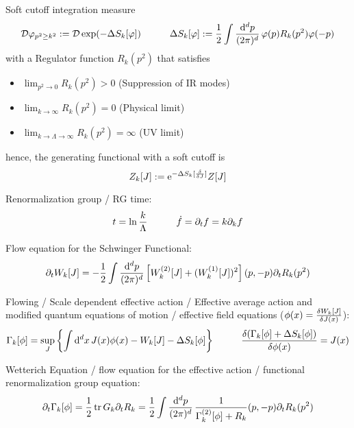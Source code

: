 		\noindent
		Soft cutoff integration measure
		\begin{equation}
			\mathcal{D}\varphi_{p^2 \ge k^2} := \mathcal{D} \exp(-\Delta S_k[\varphi])
			\hspace{30pt} \Delta S_k[\varphi] := \frac{1}{2} \int \frac{\dd^d p}{(2\pi)^d}\, \varphi(p)R_k(p^2) \varphi(-p)
		\end{equation}
		with a Regulator function $R_k(p^2)$ that satisfies
		\begin{itemize}\itemsep -0pt
			\item $\displaystyle\lim_{p^2 \rightarrow 0} R_k(p^2) > 0$ \hfill{(Suppression of IR modes)}
			\item $\displaystyle\lim_{k \rightarrow \infty} R_k(p^2) = 0$ \hfill{(Physical limit)}
			\item $\displaystyle\lim_{k \rightarrow \Lambda \rightarrow \infty} R_k(p^2) = \infty$ \hfill{(UV limit)}
		\end{itemize}
		hence, the generating functional with a soft cutoff is
		\begin{equation}
			Z_k[J] := \ex^{-\Delta S_k [\fdv{J}]}Z[J]
		\end{equation}

		\noindent
		Renormalization group / RG time:
		\begin{equation}
			t = \ln \frac{k}{\Lambda}
			\hspace{30pt} \dot{f} = \partial_t f = k \partial_k f
		\end{equation}

		\noindent
		Flow equation for the Schwinger Functional:
		\begin{equation}
			\partial_t W_k[J] = -\frac{1}{2}\int \frac{\dd^d p}{(2\pi)^d} \, \qty[W^{(2)}_k[J]+(W_k^{(1)}[J])^2](p,-p) \partial_t R_k(p^2)
		\end{equation}

		\noindent
		Flowing / Scale dependent effective action / Effective average action and modified quantum equations of motion / effective field equations ($\phi(x)= \fdv{W_k[J]}{J(x)}$):
		\begin{equation}
			\Gamma_k[\phi] = \sup_J \qty{\int \dd^d x\, J(x) \phi(x) - W_k[J] - \Delta S_k[\phi]}
			\hsp \fdv{(\Gamma_k[\phi] + \Delta S_k[\phi])}{\phi(x)} = J(x)
		\end{equation}

		\noindent
		Wetterich Equation / flow equation for the effective action / functional renormalization group equation:
		\begin{equation}
			\partial_t \Gamma_k[\phi] = \frac{1}{2} \tr G_k \partial_t R_k
			=\frac{1}{2} \int \frac{\dd^d p}{(2\pi)^d} \, \frac{1}{\Gamma^{(2)}_k[\phi] + R_k}(p,-p) \partial_t R_k(p^2)
		\end{equation}

